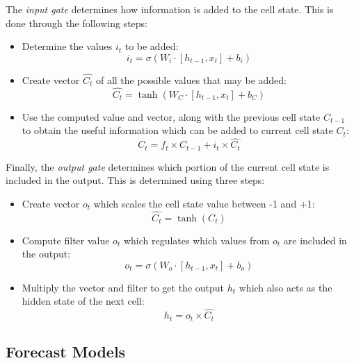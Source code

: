 The \textit{input gate} determines how information is added to the cell state. This is done through the following steps:
\begin{itemize}
    \item Determine the values $i_{t}$ to be added:
    \begin{equation}
        \label{eqn:input-gate}
        i_{t} = \sigma(W_{i}\cdot[h_{t-1}, x_{t}] + b_{i})
    \end{equation}
    \item Create vector $\hat{C_{t}}$ of all the possible values that may be added:
    \begin{equation}
        \hat{C_{t}} = \tanh( W_{C}\cdot[h_{t-1}, x_{t}] + b_{C})
    \end{equation}
    \item Use the computed value and vector, along with the previous cell state $C_{t-1}$ to obtain the useful information which can be added to current cell state $C_{t}$:
    \begin{equation}
        C_{t} = f_{t} \times C_{t-1} + i_{t} \times \hat{C_{t}}
    \end{equation}
\end{itemize}

Finally, the \textit{output gate} determines which portion of the current cell state is included in the output. This is determined using three steps:
\begin{itemize}
    \item Create vector $o_{t}$ which scales the cell state value between -1 and +1:
    \begin{equation}
        \hat{C_{t}} = \tanh(C_{t})
    \end{equation}
    \item Compute filter value $o_{t}$ which regulates which values from $o_{t}$ are included in the output:
    \begin{equation}
        o_{t} = \sigma( W_{o}\cdot[h_{t-1}, x_{t}] + b_{o})
    \end{equation}
    \item Multiply the vector and filter to get the output $h_{t}$ which also acts as the hidden state of the next cell:
    \begin{equation}
        h_{t} = o_{t} \times \hat{C_{t}}
    \end{equation}
\end{itemize}

\subsection{Forecast Models}
\label{subsec:ch2-time-series-forecast-models}

